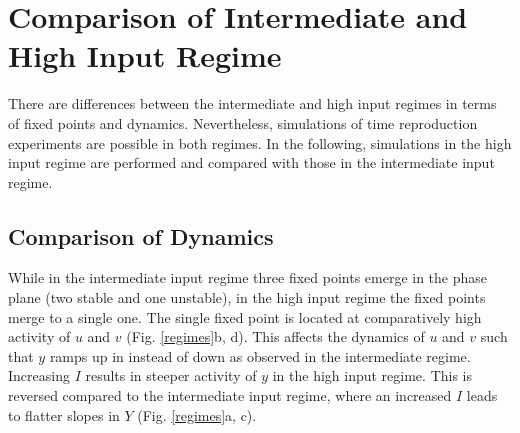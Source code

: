 \documentclass[10pt]{article}
\begin{document}
\section{Comparison of Intermediate and High Input Regime}
There are differences between the intermediate and high input regimes in terms of fixed points and dynamics.
Nevertheless, simulations of time reproduction experiments are possible in both regimes. 
In the following, simulations in the high input regime are performed and compared with those in the intermediate input regime.

\subsection{Comparison of Dynamics}
While in the intermediate input regime three fixed points emerge in the phase plane (two stable and one unstable), in the high input regime the fixed points merge to a single one. 
The single fixed point is located at comparatively high activity of $u$ and $v$ 
(Fig. \ref{regimes}b, d).
This affects the dynamics of $u$ and $v$ such that $y$ ramps up in instead of down as observed in the intermediate regime. 
Increasing $I$ results in steeper activity of $y$ in the high input regime. This is reversed compared to the intermediate input regime, where an increased $I$ leads to flatter slopes in $Y$ (Fig. \ref{regimes}a, c). 
\end{document}
